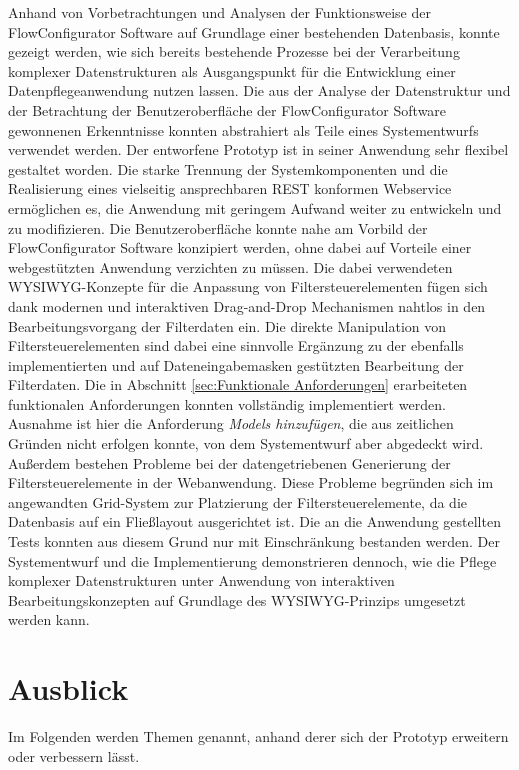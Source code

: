 Anhand von Vorbetrachtungen und Analysen der Funktionsweise der FlowConfigurator Software auf Grundlage einer bestehenden Datenbasis, konnte gezeigt werden, wie sich bereits bestehende Prozesse bei der Verarbeitung komplexer Datenstrukturen als Ausgangspunkt für die Entwicklung einer Datenpflegeanwendung nutzen lassen. Die aus der Analyse der Datenstruktur und der Betrachtung der Benutzeroberfläche der FlowConfigurator Software gewonnenen Erkenntnisse konnten abstrahiert als Teile eines Systementwurfs verwendet werden. Der entworfene Prototyp ist in seiner Anwendung sehr flexibel gestaltet worden. Die starke Trennung der Systemkomponenten und die Realisierung eines vielseitig ansprechbaren REST konformen Webservice ermöglichen es, die Anwendung mit geringem Aufwand weiter zu entwickeln und zu modifizieren. Die Benutzeroberfläche konnte nahe am Vorbild der FlowConfigurator Software konzipiert werden, ohne dabei auf Vorteile einer webgestützten Anwendung verzichten zu müssen. Die dabei verwendeten WYSIWYG-Konzepte für die Anpassung von Filtersteuerelementen fügen sich dank modernen und interaktiven Drag-and-Drop Mechanismen nahtlos in den Bearbeitungsvorgang der Filterdaten ein. Die direkte Manipulation von Filtersteuerelementen sind dabei eine sinnvolle Ergänzung zu der ebenfalls implementierten und auf Dateneingabemasken gestützten Bearbeitung der Filterdaten. Die in Abschnitt \ref{sec:Funktionale Anforderungen} erarbeiteten funktionalen Anforderungen konnten vollständig implementiert werden. Ausnahme ist hier die Anforderung \emph{Models hinzufügen}, die aus zeitlichen Gründen nicht erfolgen konnte, von dem Systementwurf aber abgedeckt wird. Außerdem bestehen Probleme bei der datengetriebenen Generierung der Filtersteuerelemente in der Webanwendung. Diese Probleme begründen sich im angewandten Grid-System zur Platzierung der Filtersteuerelemente, da die Datenbasis auf ein Fließlayout ausgerichtet ist. Die an die Anwendung gestellten Tests konnten aus diesem Grund nur mit Einschränkung bestanden werden. Der Systementwurf und die Implementierung demonstrieren dennoch, wie die Pflege komplexer Datenstrukturen unter Anwendung von interaktiven Bearbeitungskonzepten auf Grundlage des WYSIWYG-Prinzips umgesetzt werden kann.

\section{Ausblick}

Im Folgenden werden Themen genannt, anhand derer sich der Prototyp erweitern oder verbessern lässt.

